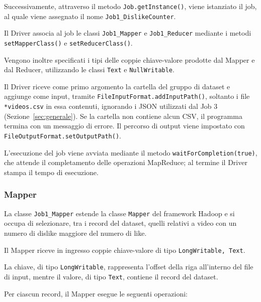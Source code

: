 \documentclass[12pt, a4paper]{article}
\begin{document}
Successivamente, attraverso il metodo
\texttt{Job.getInstance()}, viene istanziato
il job, al quale viene assegnato il nome
\texttt{Job1\_DislikeCounter}.

Il Driver associa al job le classi
\texttt{Job1\_Mapper} e \texttt{Job1\_Reducer}
mediante i metodi \texttt{setMapperClass()}
e \texttt{setReducerClass()}.

Vengono inoltre specificati i tipi delle
coppie chiave-valore prodotte dal Mapper
e dal Reducer, utilizzando le classi
\texttt{Text} e \texttt{NullWritable}.

Il Driver riceve come primo argomento la cartella
del gruppo di dataset e aggiunge come input,
tramite \texttt{FileInputFormat.addInputPath()},
soltanto i file \texttt{*videos.csv} in essa contenuti,
ignorando i JSON utilizzati dal Job 3
(Sezione~\ref{sec:generale}). Se la cartella non contiene
alcun CSV, il programma termina con un messaggio di errore.
Il percorso di output viene impostato con
\texttt{FileOutputFormat.setOutputPath()}.

L'esecuzione del job viene avviata mediante
il metodo \texttt{waitForCompletion(true)},
che attende il completamento delle
operazioni MapReduce; al termine il Driver
stampa il tempo di esecuzione.

\subsubsection{Mapper}

La classe \texttt{Job1\_Mapper} estende la classe
\texttt{Mapper} del framework Hadoop e si occupa
di selezionare, tra i record del dataset, quelli
relativi a video con un numero di dislike
maggiore del numero di like.

Il Mapper riceve in ingresso coppie chiave-valore
di tipo \texttt{LongWritable, Text}.

La chiave, di tipo \texttt{LongWritable},
rappresenta l'offset della riga all'interno del
file di input, mentre il valore, di tipo
\texttt{Text}, contiene il record del dataset.

Per ciascun record, il Mapper esegue le
seguenti operazioni:
\end{document}
